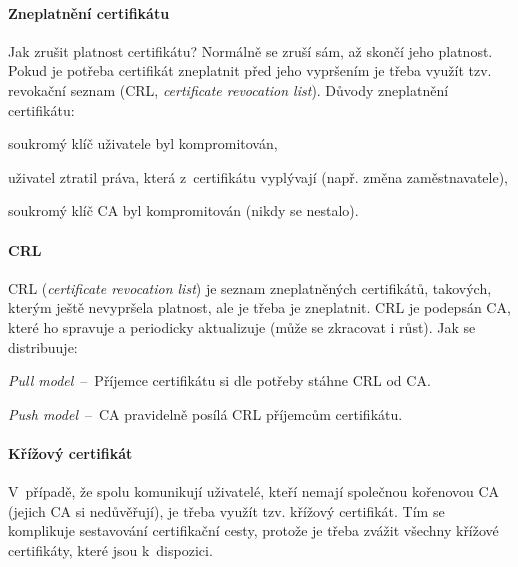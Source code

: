 \paragraph*{Zneplatnění certifikátu} Jak zrušit platnost certifikátu? Normálně se zruší sám, až skončí jeho platnost. Pokud je potřeba certifikát zneplatnit před jeho vypršením je třeba využít tzv. revokační seznam (CRL, \textit{certificate revocation list}). Důvody zneplatnění certifikátu: \begin{compactitem}
    \item soukromý klíč uživatele byl kompromitován,
    \item uživatel ztratil práva, která z~certifikátu vyplývají (např. změna zaměstnavatele),
    \item soukromý klíč CA byl kompromitován (nikdy se nestalo).
\end{compactitem}

\paragraph*{CRL} CRL (\textit{certificate revocation list}) je seznam zneplatněných certifikátů, takových, kterým ještě nevypršela platnost, ale je třeba je zneplatnit. CRL je podepsán CA, které ho spravuje a periodicky aktualizuje (může se zkracovat i růst). Jak se distribuuje:\begin{compactitem}
    \item \textit{Pull model}~--~Příjemce certifikátu si dle potřeby stáhne CRL od CA.
    \item \textit{Push model}~--~CA pravidelně posílá CRL příjemcům certifikátu.
\end{compactitem}

\paragraph*{Křížový certifikát} V~případě, že spolu komunikují uživatelé, kteří nemají společnou kořenovou CA (jejich CA si nedůvěřují), je třeba využít tzv. křížový certifikát. Tím se komplikuje sestavování certifikační cesty, protože je třeba zvážit všechny křížové certifikáty, které jsou k~dispozici.

